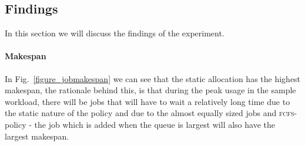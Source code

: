 

\subsection{Findings}
In this section we will discuss the findings of the experiment.

\paragraph{Makespan}
In Fig.~\ref{figure_jobmakespan} we can see that the static allocation
has the highest makespan, the rationale behind this, is that during
the peak usage in the sample workload, there will be jobs that will
have to wait a relatively long time due to the static nature of the
policy and due to the almost equally sized jobs and
\textsc{fcfs}-policy - the job which is added when the queue is largest
will also have the largest makespan.










